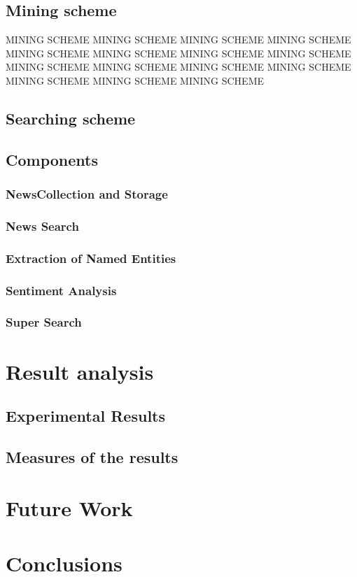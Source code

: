 \documentclass{acm_proc_article-sp}
\begin{document}
\subsection{Mining scheme}
MINING SCHEME MINING SCHEME MINING SCHEME MINING SCHEME MINING SCHEME MINING SCHEME MINING SCHEME MINING SCHEME MINING SCHEME MINING SCHEME MINING SCHEME MINING SCHEME MINING SCHEME MINING SCHEME MINING SCHEME 

\subsection{Searching scheme}


\subsection{Components}

\subsubsection{NewsCollection and Storage}

\subsubsection{News Search}

\subsubsection{Extraction of Named Entities}


\subsubsection{Sentiment Analysis}


\subsubsection{Super Search}


\section{Result analysis}

\subsection{Experimental Results}

\subsection{Measures of the results}


\section{Future Work}


\section{Conclusions}
\end{document}
